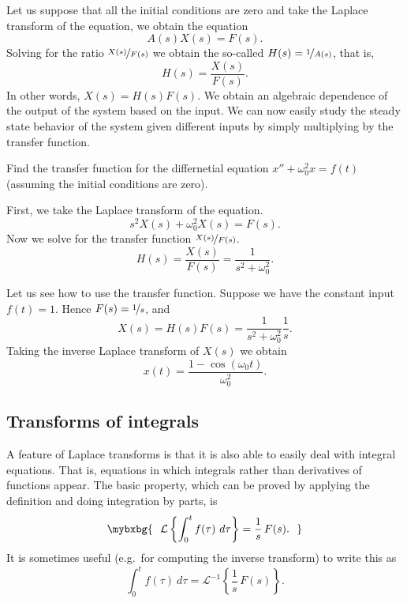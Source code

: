 Let us suppose that
all the initial conditions are zero and take the Laplace transform
of the equation, we obtain the equation
\begin{equation*}
A(s) X(s) = F(s) .
\end{equation*}
Solving for the ratio $\nicefrac{X(s)}{F(s)}$ we obtain the so-called
\emph{}
$H(s) = \nicefrac{1}{A(s)}$,
that is,
\begin{equation*}
H(s) = \frac{X(s)}{F(s)} .
\end{equation*}
In other words, $X(s) = H(s) F(s)$.  We obtain an algebraic dependence of
the output of the system based on the input.  We can now easily study the
steady state behavior of the system given different inputs by simply
multiplying by the transfer function.

\begin{example}
Find the transfer function for the differnetial equation $x'' + \omega_0^2 x = f(t)$
(assuming the initial conditions are zero).
\end{example}

\begin{exampleSol}
First, we take the Laplace transform of the equation.
\begin{equation*}
s^2 X(s) + \omega_0^2 X(s) = F(s) .
\end{equation*}
Now we solve for the transfer function $\nicefrac{X(s)}{F(s)}$.
\begin{equation*}
H(s) = \frac{X(s)}{F(s)} = \frac{1}{s^2 + \omega_0^2} .
\end{equation*}

Let us see how to use the transfer function.  Suppose we have the constant input
$f(t) = 1$.  Hence $F(s) = \nicefrac{1}{s}$, and
\begin{equation*}
X(s) = H(s) F(s) = \frac{1}{s^2+\omega_0^2} \frac{1}{s} .
\end{equation*}
Taking the inverse Laplace transform of $X(s)$ we obtain
\begin{equation*}
x(t) = \frac{1-\cos(\omega_0 t)}{\omega_0^2} .
\end{equation*}
\end{exampleSol}

\subsection{Transforms of integrals}

A feature of Laplace transforms is that it is also able to easily deal
with integral equations.  That is, equations in which integrals rather than
derivatives of functions appear.  The basic property, which can be proved
by applying the definition and doing integration by parts, is 
\begin{equation*}
\mybxbg{~~
\mathcal{L} \left\{
\int_0^t f(\tau) ~ d\tau
\right\} = \frac{1}{s} \, F(s) .
~~}
\end{equation*}
It is sometimes useful (e.g.\ for computing the inverse transform) to write
this as
\begin{equation*}
\int_0^t f(\tau) ~ d\tau
=
{\mathcal{L}}^{-1} \left\{
\frac{1}{s} \, F(s) \right\} .
\end{equation*}

